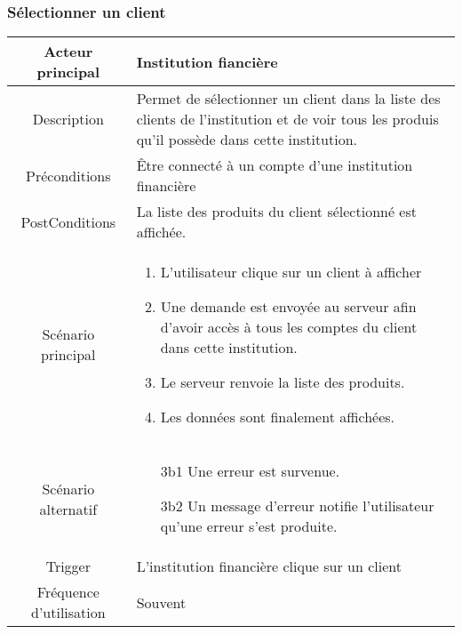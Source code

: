 \documentclass{article}
\begin{document}
\subsubsection{Sélectionner un client}
\begin{table}[h]
   \begin{tabular}{|c|p{10cm}|}
      \hline
      Acteur principal&Institution fiancière\\
      \hline
      Description&Permet de sélectionner un client dans la liste des clients de l’institution et de voir tous les produis qu’il possède dans cette institution.\\
      \hline
      Préconditions&Être connecté à un compte d’une institution financière\\
      \hline
      PostConditions&La liste des produits du client sélectionné est affichée.\\
      \hline
      Scénario principal& 
            \begin{enumerate}
               \item L’utilisateur clique sur un client à afficher
               \item Une demande est envoyée au serveur afin d’avoir accès à tous les comptes du client dans cette institution.
               \item Le serveur renvoie la liste des produits.
               \item Les données sont finalement affichées.
            \end{enumerate}     \\
      \hline
      Scénario alternatif&
            \begin{itemize}
               \item[3b1] Une erreur est survenue.
               \item[3b2] Un message d'erreur notifie l'utilisateur qu'une erreur s'est produite.  
            \end{itemize}\\
      \hline
      Trigger&L'institution financière clique sur un client\\
      \hline
      Fréquence d'utilisation&Souvent\\
      \hline
   \end{tabular}
\end{table}

\newpage
\end{document}
